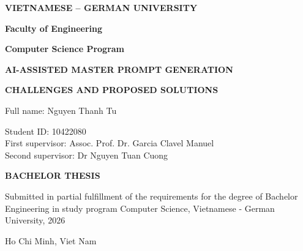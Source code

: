 \begin{titlepage}
\centering
\vspace*{3.2cm}

{\bfseries\large VIETNAMESE -- GERMAN UNIVERSITY\par}
\vspace{1cm}
{\bfseries Faculty of Engineering\par}
{\bfseries Computer Science Program\par}

\vspace{1.8cm}
{\bfseries\large AI-ASSISTED MASTER PROMPT GENERATION\par}
{\bfseries\large CHALLENGES AND PROPOSED SOLUTIONS\par}

\vspace{1.5cm}
Full name: Nguyen Thanh Tu

\vspace{1cm}
Student ID: 10422080\\[6pt]
First supervisor: Assoc. Prof. Dr. Garcia Clavel Manuel\\[6pt]
Second supervisor: Dr Nguyen Tuan Cuong

\vspace{1.5cm}
{\bfseries\large BACHELOR THESIS\par}

\vspace{1.8cm}
Submitted in partial fulfillment of the requirements for the degree of
Bachelor Engineering in study program Computer Science, Vietnamese - German
University, 2026

\vfill
Ho Chi Minh, Viet Nam
\vspace{2.2cm}

\end{titlepage}
